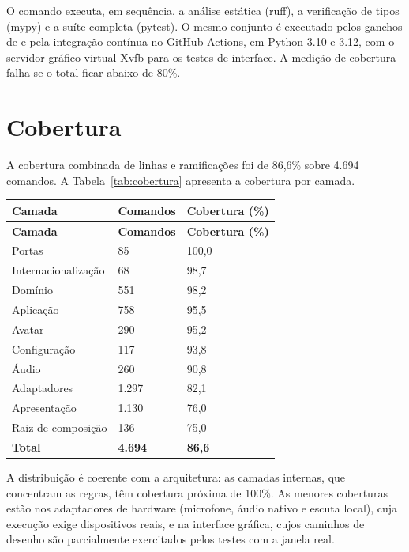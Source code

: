 O comando  executa, em sequência, a análise estática (ruff), a verificação de tipos
(mypy) e a suíte completa (pytest). O mesmo conjunto é executado pelos ganchos de  e
pela integração contínua no GitHub Actions, em Python 3.10 e 3.12, com o servidor gráfico virtual Xvfb
para os testes de interface. A medição de cobertura falha se o total ficar abaixo de 80\%.

\section{Cobertura}

A cobertura combinada de linhas e ramificações foi de 86,6\% sobre 4.694 comandos. A
Tabela~\ref{tab:cobertura} apresenta a cobertura por camada.

\begin{singlespace}
\label{tab:cobertura}
\small
\begin{tabularx}{\textwidth}{LC{2.6cm}C{3.2cm}}
\toprule
\textbf{Camada} & \textbf{Comandos} & \textbf{Cobertura (\%)} \\ \midrule
\endfirsthead
\toprule
\textbf{Camada} & \textbf{Comandos} & \textbf{Cobertura (\%)} \\ \midrule
\endhead
Portas & 85 & 100,0 \\
Internacionalização & 68 & 98,7 \\
Domínio & 551 & 98,2 \\
Aplicação & 758 & 95,5 \\
Avatar & 290 & 95,2 \\
Configuração & 117 & 93,8 \\
Áudio & 260 & 90,8 \\
Adaptadores & 1.297 & 82,1 \\
Apresentação & 1.130 & 76,0 \\
Raiz de composição & 136 & 75,0 \\ \midrule
\textbf{Total} & \textbf{4.694} & \textbf{86,6} \\
\bottomrule
\end{tabularx}
\end{singlespace}

A distribuição é coerente com a arquitetura: as camadas internas, que concentram as regras, têm
cobertura próxima de 100\%. As menores coberturas estão nos adaptadores de hardware (microfone,
áudio nativo e escuta local), cuja execução exige dispositivos reais, e na interface gráfica, cujos
caminhos de desenho são parcialmente exercitados pelos testes com a janela real.

